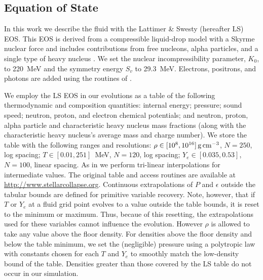 \subsection{Equation of State}
\label{sec:EOS}

In this work we describe the fluid with the Lattimer \& Swesty (hereafter LS) EOS.
This EOS is derived from a compressible
liquid-drop model with a Skyrme nuclear force and includes contributions
from free nucleons, alpha particles, and a single type of heavy nucleus \citep{latt1991-nuc_eos}.
We set the nuclear incompressibility parameter, $K_0$, to 220~MeV and the
symmetry energy $S_v$ to 29.3~MeV.
Electrons, positrons, and photons are
added using the routines of \cite{timm1999-nuc_eos}.


We employ the LS EOS in our evolutions as a table of the following thermodynamic
and composition quantities: internal energy; pressure; sound speed;
neutron, proton, and electron chemical potentials;
and neutron, proton, alpha particle and characteristic heavy nucleus mass fractions
(along with the characteristic heavy nucleus's average mass and charge number).
We store the table with the following ranges and resolutions:
$\rho \in [10^{8},10^{16}]\rm\,g\,cm^{-3}$,
	$N=250$, log spacing;
$T \in [0.01,251]$~MeV,
	$N=120$, log spacing;
$Y_e \in [0.035,0.53]$,
	$N=100$, linear spacing.
As in \cite{ocon2010-gr1d} we perform tri-linear interpolations
for intermediate values. The original table and access routines
are available at \url{http://www.stellarcollapse.org}.
Continuous extrapolations of $P$ and $\epsilon$ outside the tabular bounds
are defined for primitive variable recovery. Note, however, that if $T$ or $Y_e$ at a
fluid grid point evolves to a value outside the table bounds, it is reset to the minimum or maximum.
Thus, becaue of this resetting, the extrapolations used for these
variables cannot influence the evolution.
However $\rho$ is allowed to take any value above the floor density. 
For densities above the floor density and below the table minimum, we
set the (negligible) pressure using a polytropic law with constants chosen
for each $T$ and $Y_e$ to smoothly match the low-density bound of the table. 
Densities greater than those
covered by the LS table do not occur in our simulation.

